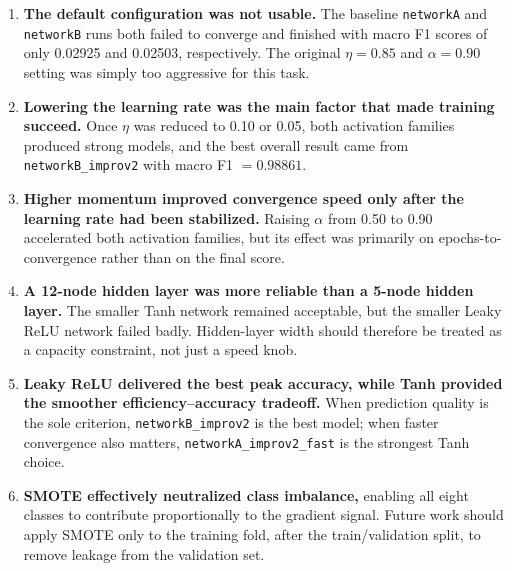 \documentclass{acm_proc_article-sp}
\begin{document}
\begin{enumerate}
  \item \textbf{The default configuration was not usable.} The baseline
        \texttt{networkA} and \texttt{networkB} runs both failed to
        converge and finished with macro F1 scores of only 0.02925 and
        0.02503, respectively.  The original $\eta=0.85$ and
        $\alpha=0.90$ setting was simply too aggressive for this task.

  \item \begin{sloppypar}\textbf{Lowering the learning rate was the main factor that made
        training succeed.} Once $\eta$ was reduced to 0.10 or 0.05, both
        activation families produced strong models, and the best overall
        result came from \texttt{networkB\_improv2} with macro
        F1 $=0.98861$.\end{sloppypar}

  \item \textbf{Higher momentum improved convergence speed only after
        the learning rate had been stabilized.} Raising $\alpha$ from
        0.50 to 0.90 accelerated both activation families, but its
        effect was primarily on epochs-to-convergence rather than on the
        final score.

  \item \textbf{A 12-node hidden layer was more reliable than a 5-node
        hidden layer.} The smaller Tanh network remained acceptable, but
        the smaller Leaky ReLU network failed badly.  Hidden-layer width
        should therefore be treated as a capacity constraint, not just a
        speed knob.

  \item \begin{sloppypar}\textbf{Leaky ReLU delivered the best peak accuracy, while Tanh
        provided the smoother efficiency--accuracy tradeoff.}
        When prediction quality is the sole criterion,
        \texttt{networkB\_improv2} is the best model; when faster
        convergence also matters, \texttt{networkA\_improv2\_fast} is
        the strongest Tanh choice.\end{sloppypar}

  \item \textbf{SMOTE effectively neutralized class imbalance,} enabling
        all eight classes to contribute proportionally to the gradient
        signal.  Future work should apply SMOTE only to the training
        fold, after the train/validation split, to remove leakage from
        the validation set.
\end{enumerate}
\end{document}
